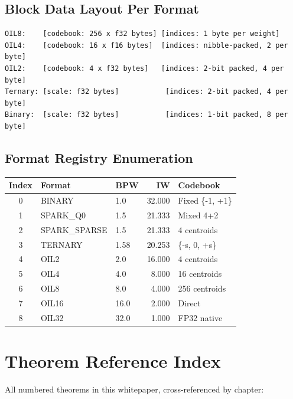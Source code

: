\documentclass[11pt,a4paper,twoside]{report}
\theoremstyle{definition}
\begin{document}
\section{Block Data Layout Per Format}

\begin{verbatim}
OIL8:    [codebook: 256 x f32 bytes] [indices: 1 byte per weight]
OIL4:    [codebook: 16 x f16 bytes]  [indices: nibble-packed, 2 per byte]
OIL2:    [codebook: 4 x f32 bytes]   [indices: 2-bit packed, 4 per byte]
Ternary: [scale: f32 bytes]           [indices: 2-bit packed, 4 per byte]
Binary:  [scale: f32 bytes]           [indices: 1-bit packed, 8 per byte]
\end{verbatim}

\section{Format Registry Enumeration}

\begin{center}
\begin{tabular}{cllrl}
\toprule
\textbf{Index} & \textbf{Format} & \textbf{BPW} & \textbf{IW} & \textbf{Codebook} \\
\midrule
0 & BINARY & 1.0 & 32.000 & Fixed \{-1, +1\} \\
1 & SPARK\_Q0 & 1.5 & 21.333 & Mixed 4+2 \\
2 & SPARK\_SPARSE & 1.5 & 21.333 & 4 centroids \\
3 & TERNARY & 1.58 & 20.253 & \{-s, 0, +s\} \\
4 & OIL2 & 2.0 & 16.000 & 4 centroids \\
5 & OIL4 & 4.0 & 8.000 & 16 centroids \\
6 & OIL8 & 8.0 & 4.000 & 256 centroids \\
7 & OIL16 & 16.0 & 2.000 & Direct \\
8 & OIL32 & 32.0 & 1.000 & FP32 native \\
\bottomrule
\end{tabular}
\end{center}

\chapter{Theorem Reference Index}
\label{app:theorem_index}

All numbered theorems in this whitepaper, cross-referenced by chapter:
\end{document}
